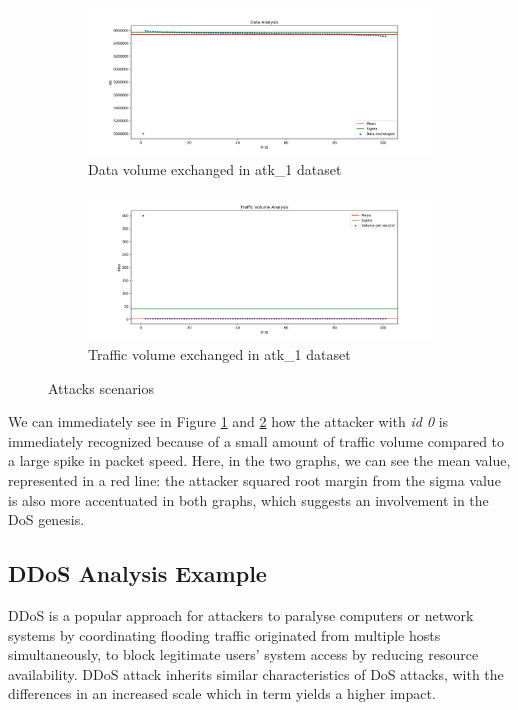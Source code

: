 \begin{figure}[h]
	\begin{subfigure}{0.48\textwidth}
		\includegraphics[scale=0.30]{imgs/atk_1-data_analysis}
  		\caption{Data volume exchanged in atk\_1 dataset}
  		\label{fig:atk1datavolumeexchanged}
	\end{subfigure}
	\hspace*{\fill} %
	\begin{subfigure}{0.48\textwidth}
  		\includegraphics[scale=0.30]{imgs/atk_1-volume_analysis}
  		\caption{Traffic volume exchanged in atk\_1 dataset}
  		\label{fig:atk1trafficvolumeexchanged}
	\end{subfigure}
	\caption{Attacks scenarios}
	\label{fig:atk_1}
\end{figure}


We can immediately see in Figure \ref{fig:atk1datavolumeexchanged} and \ref{fig:atk1trafficvolumeexchanged} how the attacker with \textit{id 0} is immediately recognized because of a small amount of traffic volume compared to a large spike in packet speed. Here, in the two graphs, we can see the mean value, represented in a red line: the attacker squared root margin from the sigma value is also more accentuated in both graphs, which suggests an involvement in the DoS genesis.

\subsection{DDoS Analysis Example}
DDoS is a popular approach for attackers to paralyse computers or network systems by coordinating flooding traffic originated from multiple hosts simultaneously, to block legitimate users' system access by reducing resource availability. DDoS attack inherits similar characteristics of DoS attacks, with the differences in an increased scale which in term yields a higher impact\cite{ddos_forensics}.

